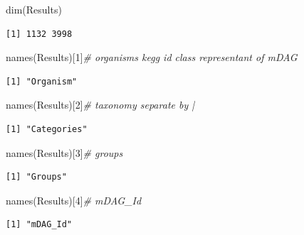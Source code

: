 \documentclass[
  letterpaper,
  DIV=11,
  numbers=noendperiod]{scrreprt}
\newenvironment{Shaded}{}{}
\newcommand{\CommentTok}[1]{\textcolor[rgb]{0.36,0.39,0.44}{\textit{#1}}}
\newcommand{\DecValTok}[1]{\textcolor[rgb]{0.82,0.60,0.40}{#1}}
\newcommand{\FunctionTok}[1]{\textcolor[rgb]{0.38,0.69,0.94}{#1}}
\newcommand{\NormalTok}[1]{\textcolor[rgb]{0.67,0.70,0.75}{#1}}
\begin{document}
\begin{Shaded}
\begin{Highlighting}[]
\FunctionTok{dim}\NormalTok{(Results)}
\end{Highlighting}
\end{Shaded}

\begin{verbatim}
[1] 1132 3998
\end{verbatim}

\begin{Shaded}
\begin{Highlighting}[]
\FunctionTok{names}\NormalTok{(Results)[}\DecValTok{1}\NormalTok{]}\CommentTok{\# organisms  kegg id  class representant of mDAG}
\end{Highlighting}
\end{Shaded}

\begin{verbatim}
[1] "Organism"
\end{verbatim}

\begin{Shaded}
\begin{Highlighting}[]
\FunctionTok{names}\NormalTok{(Results)[}\DecValTok{2}\NormalTok{]}\CommentTok{\# taxonomy separate by |}
\end{Highlighting}
\end{Shaded}

\begin{verbatim}
[1] "Categories"
\end{verbatim}

\begin{Shaded}
\begin{Highlighting}[]
\FunctionTok{names}\NormalTok{(Results)[}\DecValTok{3}\NormalTok{]}\CommentTok{\# groups }
\end{Highlighting}
\end{Shaded}

\begin{verbatim}
[1] "Groups"
\end{verbatim}

\begin{Shaded}
\begin{Highlighting}[]
\FunctionTok{names}\NormalTok{(Results)[}\DecValTok{4}\NormalTok{]}\CommentTok{\# mDAG\_Id }
\end{Highlighting}
\end{Shaded}

\begin{verbatim}
[1] "mDAG_Id"
\end{verbatim}
\end{document}
